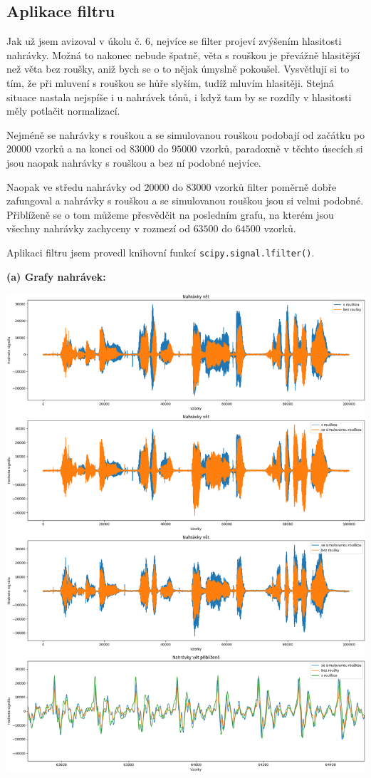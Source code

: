 \documentclass[12pt]{article}
\begin{document}
\subsection{Aplikace filtru}
\hspace{1.5em}Jak už jsem avizoval v úkolu č. 6, nejvíce se filter projeví zvýšením hlasitosti nahrávky. Možná to nakonec nebude špatně, věta s rouškou je převážně hlasitější než věta bez roušky, aniž bych se o to nějak úmyslně pokoušel. Vysvětluji si to tím, že při mluvení s rouškou se hůře slyším, tudíž mluvím hlasitěji. Stejná situace nastala nejspíše i u nahrávek tónů, i když tam by se rozdíly v hlasitosti měly potlačit normalizací.

\hspace{1.5em}Nejméně se nahrávky s rouškou a se simulovanou rouškou podobají od začátku po $20000$ vzorků a na konci od $83000$ do $95000$ vzorků, paradoxně v těchto úsecích si jsou naopak nahrávky s rouškou a bez ní podobné nejvíce.

\hspace{1.5em}Naopak ve středu nahrávky od $20000$ do $83000$ vzorků filter poměrně dobře zafungoval a nahrávky s rouškou a se simulovanou rouškou jsou si velmi podobné. Přiblíženě se o tom můžeme přesvědčit na posledním grafu, na kterém jsou všechny nahrávky zachyceny v rozmezí od $63500$ do $64500$ vzorků.

\hspace{1.5em}Aplikaci filtru jsem provedl knihovní funkcí \texttt{scipy.signal.lfilter()}.

\newpage
\textbf{(a) Grafy nahrávek:}

\includegraphics[scale=0.44]{ukol8.png}
\end{document}
